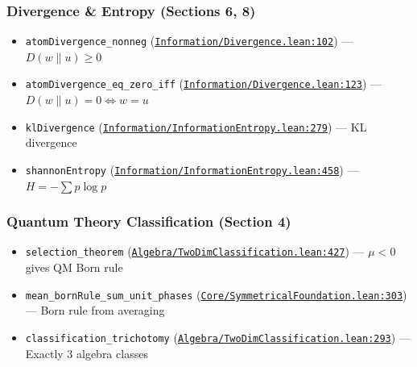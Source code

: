 \documentclass[11pt]{article}
\theoremstyle{definition}
\theoremstyle{remark}
\begin{document}
\subsubsection*{Divergence \& Entropy (Sections 6, 8)}
\begin{itemize}
\item \texttt{atomDivergence\_nonneg} (\href{https://github.com/zariuq/ks-foundations-of-inference/blob/main/KnuthSkilling/Information/Divergence.lean\#L102}{\texttt{Information/Divergence.lean:102}}) --- $D(w \| u) \geq 0$
\item \texttt{atomDivergence\_eq\_zero\_iff} (\href{https://github.com/zariuq/ks-foundations-of-inference/blob/main/KnuthSkilling/Information/Divergence.lean\#L123}{\texttt{Information/Divergence.lean:123}}) --- $D(w \| u) = 0 \Leftrightarrow w = u$
\item \texttt{klDivergence} (\href{https://github.com/zariuq/ks-foundations-of-inference/blob/main/KnuthSkilling/Information/InformationEntropy.lean\#L279}{\texttt{Information/InformationEntropy.lean:279}}) --- KL divergence
\item \texttt{shannonEntropy} (\href{https://github.com/zariuq/ks-foundations-of-inference/blob/main/KnuthSkilling/Information/InformationEntropy.lean\#L458}{\texttt{Information/InformationEntropy.lean:458}}) --- $H = -\sum p \log p$
\end{itemize}

\subsubsection*{Quantum Theory Classification (Section 4)}
\begin{itemize}
\item \texttt{selection\_theorem} (\href{https://github.com/zariuq/ks-foundations-of-inference/blob/main/Algebra/TwoDimClassification.lean\#L427}{\texttt{Algebra/TwoDimClassification.lean:427}}) --- $\mu < 0$ gives QM Born rule
\item \texttt{mean\_bornRule\_sum\_unit\_phases} (\href{https://github.com/zariuq/ks-foundations-of-inference/blob/main/KnuthSkilling/Core/SymmetricalFoundation.lean\#L303}{\texttt{Core/SymmetricalFoundation.lean:303}}) --- Born rule from averaging
\item \texttt{classification\_trichotomy} (\href{https://github.com/zariuq/ks-foundations-of-inference/blob/main/Algebra/TwoDimClassification.lean\#L293}{\texttt{Algebra/TwoDimClassification.lean:293}}) --- Exactly 3 algebra classes
\end{itemize}
\end{document}

